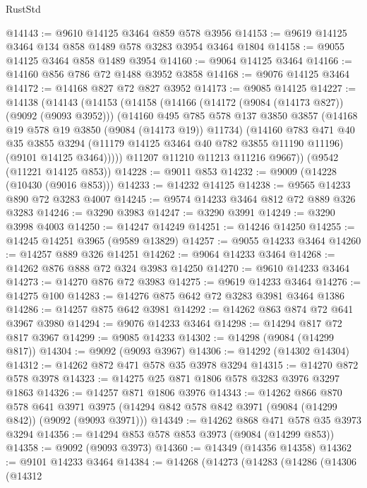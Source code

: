 \begin{lexlean}{RustStd}
\begin{coremodule}
@14143 := @9610 @14125 @3464 @859 @578 @3956
@14153 := @9619 @14125 @3464 @134 @858 @1489 @578 @3283 @3954 @3464 @1804
@14158 := @9055 @14125 @3464 @858 @1489 @3954
@14160 := @9064 @14125 @3464
@14166 := @14160 @856 @786 @72 @1488 @3952 @3858
@14168 := @9076 @14125 @3464
@14172 := @14168 @827 @72 @827 @3952
@14173 := @9085 @14125
@14227 := @14138
    (@14143
      (@14153
        (@14158
          (@14166
            (@14172 (@9084 (@14173 @827)) (@9092 (@9093 @3952)))
            (@14160
              @495
              @785
              @578
              @137
              @3850
              @3857
              (@14168 @19 @578 @19 @3850 (@9084 (@14173 @19)) @11734)
              (@14160
                @783
                @471
                @40
                @35
                @3855
                @3294
                (@11179 @14125 @3464 @40 @782 @3855 @11190 @11196)
                (@9101 @14125 @3464)))))
        @11207
        @11210
        @11213
        @11216
        @9667))
    (@9542 (@11221 @14125 @853))
@14228 := @9011 @853
@14232 := @9009 (@14228 (@10430 (@9016 @853)))
@14233 := @14232 @14125
@14238 := @9565 @14233 @890 @72 @3283 @4007
@14245 := @9574 @14233 @3464 @812 @72 @889 @326 @3283
@14246 := @3290 @3983
@14247 := @3290 @3991
@14249 := @3290 @3998 @4003
@14250 := @14247 @14249
@14251 := @14246 @14250
@14255 := @14245 @14251 @3965 (@9589 @13829)
@14257 := @9055 @14233 @3464
@14260 := @14257 @889 @326 @14251
@14262 := @9064 @14233 @3464
@14268 := @14262 @876 @888 @72 @324 @3983 @14250
@14270 := @9610 @14233 @3464
@14273 := @14270 @876 @72 @3983
@14275 := @9619 @14233 @3464
@14276 := @14275 @100
@14283 := @14276 @875 @642 @72 @3283 @3981 @3464 @1386
@14286 := @14257 @875 @642 @3981
@14292 := @14262 @863 @874 @72 @641 @3967 @3980
@14294 := @9076 @14233 @3464
@14298 := @14294 @817 @72 @817 @3967
@14299 := @9085 @14233
@14302 := @14298 (@9084 (@14299 @817))
@14304 := @9092 (@9093 @3967)
@14306 := @14292 (@14302 @14304)
@14312 := @14262 @872 @471 @578 @35 @3978 @3294
@14315 := @14270 @872 @578 @3978
@14323 := @14275 @25 @871 @1806 @578 @3283 @3976 @3297 @1863
@14326 := @14257 @871 @1806 @3976
@14343 := @14262
    @866
    @870
    @578
    @641
    @3971
    @3975
    (@14294 @842 @578 @842 @3971 (@9084 (@14299 @842)) (@9092 (@9093 @3971)))
@14349 := @14262 @868 @471 @578 @35 @3973 @3294
@14356 := @14294 @853 @578 @853 @3973 (@9084 (@14299 @853))
@14358 := @9092 (@9093 @3973)
@14360 := @14349 (@14356 @14358)
@14362 := @9101 @14233 @3464
@14384 := @14268
    (@14273
      (@14283
        (@14286
          (@14306
            (@14312

\end{coremodule}
\end{lexlean}
